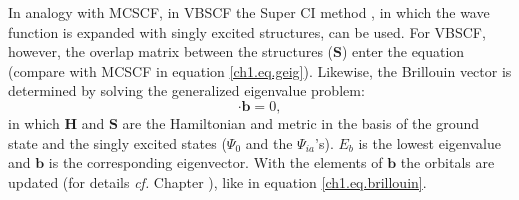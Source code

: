 In analogy with MCSCF, in VBSCF the Super CI method \cite{superci1,superci2}, in which the wave function is expanded with singly excited structures, can be used. For VBSCF, however, the overlap matrix between the structures ($\mathbf{S}$) enter the equation (compare with MCSCF in equation \ref{ch1.eq.geig}). Likewise, the  Brillouin vector is determined by solving the generalized eigenvalue problem:
\begin{equation}
[\mathbf{H}-E_b\mathbf{S}] \cdot \mathbf{b} = 0,
\label{ch1.eq.geigvb}
\end{equation}
in which $\mathbf{H}$ and $\mathbf{S}$ are the Hamiltonian and metric in the basis of the ground state and the singly excited states ($\Psi_0$ and the $\Psi_{ia}$'s). $E_b$ is the lowest eigenvalue and $\mathbf{b}$ is the corresponding eigenvector. With the elements of $\mathbf{b}$ the orbitals are updated (for details  \textit{cf.} Chapter \chorbopt), like in equation \ref{ch1.eq.brillouin}.

